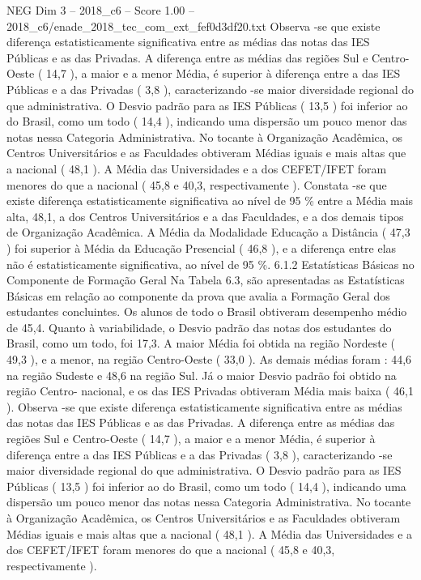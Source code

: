 \begin{textsample}{NEG Dim 3 – 2018\_c6 – Score 1.00 – 2018\_c6/enade\_2018\_tec\_com\_ext\_fef0d3df20.txt}
Observa -se que existe diferença estatisticamente significativa entre as médias das notas das IES Públicas e as das Privadas.
A diferença entre as médias das regiões Sul e Centro-Oeste ( 14,7 ), a maior e a menor Média, é superior à diferença entre a das IES Públicas e a das Privadas ( 3,8 ), caracterizando -se maior diversidade regional do que administrativa.
O Desvio padrão para as IES Públicas ( 13,5 ) foi inferior ao do Brasil, como um todo ( 14,4 ), indicando uma dispersão um pouco menor das notas nessa Categoria Administrativa.
No tocante à Organização Acadêmica, os Centros Universitários e as Faculdades obtiveram Médias iguais e mais altas que a nacional ( 48,1 ).
A Média das Universidades e a dos CEFET/IFET foram menores do que a nacional ( 45,8 e 40,3, respectivamente ).
Constata -se que existe diferença estatisticamente significativa ao nível de 95 \% entre a Média mais alta, 48,1, a dos Centros Universitários e a das Faculdades, e a dos demais tipos de Organização Acadêmica.
A Média da Modalidade Educação a Distância ( 47,3 ) foi superior à Média da Educação Presencial ( 46,8 ), e a diferença entre elas não é estatisticamente significativa, ao nível de 95 \%. 6.1.2 Estatísticas Básicas no Componente de Formação Geral Na Tabela 6.3, são apresentadas as Estatísticas Básicas em relação ao componente da prova que avalia a Formação Geral dos estudantes concluintes.
Os alunos de todo o Brasil obtiveram desempenho médio de 45,4.
Quanto à variabilidade, o Desvio padrão das notas dos estudantes do Brasil, como um todo, foi 17,3.
A maior Média foi obtida na região Nordeste ( 49,3 ), e a menor, na região Centro-Oeste ( 33,0 ).
As demais médias foram : 44,6 na região Sudeste e 48,6 na região Sul.
Já o maior Desvio padrão foi obtido na região Centro- nacional, e os das IES Privadas obtiveram Média mais baixa ( 46,1 ).
Observa -se que existe diferença estatisticamente significativa entre as médias das notas das IES Públicas e as das Privadas.
A diferença entre as médias das regiões Sul e Centro-Oeste ( 14,7 ), a maior e a menor Média, é superior à diferença entre a das IES Públicas e a das Privadas ( 3,8 ), caracterizando -se maior diversidade regional do que administrativa.
O Desvio padrão para as IES Públicas ( 13,5 ) foi inferior ao do Brasil, como um todo ( 14,4 ), indicando uma dispersão um pouco menor das notas nessa Categoria Administrativa.
No tocante à Organização Acadêmica, os Centros Universitários e as Faculdades obtiveram Médias iguais e mais altas que a nacional ( 48,1 ).
A Média das Universidades e a dos CEFET/IFET foram menores do que a nacional ( 45,8 e 40,3, respectivamente ).

\end{textsample}
